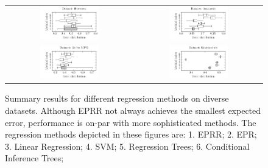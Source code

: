 \documentclass[times,review,preprint]{elsarticle}
\begin{document}
\begin{figure}[tb]\begin{center}
\begin{tabular}{cc}
\includegraphics[width=0.48\textwidth]{figure_3a.pdf}
&
\includegraphics[width=0.48\textwidth]{figure_3b.pdf}
\\
\includegraphics[width=0.48\textwidth]{figure_3c.pdf}
&
\includegraphics[width=0.48\textwidth]{figure_3d.pdf}
\end{tabular}
%
\caption{Summary results for different regression methods on diverse datasets. Although \ac{EPRR} not always achieves the smallest expected error, performance is on-par with more sophisticated methods.  The regression methods depicted in these figures are: 1. \ac{EPRR}; 2. \ac{EPR}; 3. Linear Regression; 4. \ac{SVM}; 5. Regression Trees; 6. Conditional Inference Trees;}
\label{fig:four.datasets.summary}
\label{Housing_dataset_lambda0.8_25runs}
\label{Abalone_dataset_lambda0.8_25runs}
\label{Auto-Mpg_dataset_lambda0.8_25runs}
\label{Kinematics300_lambda0.8_25runs}
\end{center}\end{figure}
\end{document}
